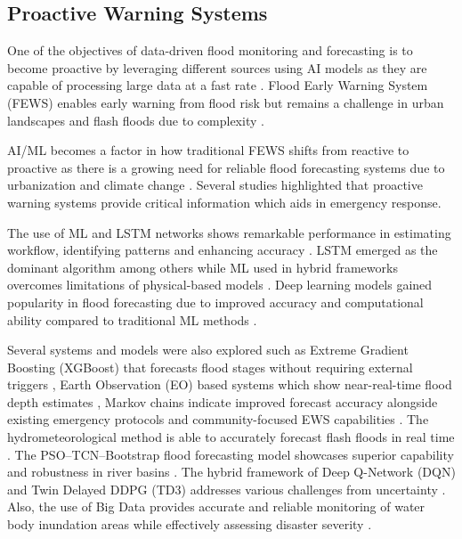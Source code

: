 \documentclass{research}
\begin{document}
\subsection*{Proactive Warning Systems}

One of the objectives of data-driven flood monitoring and forecasting is to become proactive by leveraging different sources using AI models as they are capable of processing large data at a fast rate \cite{demelo2024early,zlopasa2024leveraging}. Flood Early Warning System (FEWS) enables early warning from flood risk but remains a challenge in urban landscapes \cite{hofmann2020risk,lee2020integrated,palash2024datadriven} and flash floods due to complexity \cite{soares2025ml4ff}.

AI/ML becomes a factor in how traditional FEWS shifts from reactive to proactive \cite{alrawas2024critical,piadeh2022critical} as there is a growing need for reliable flood forecasting systems due to urbanization and climate change \cite{fernandeznovoa2024enhancing,hossoda2025datadriven,oddo2024deep}. Several studies \cite{lee2023maxfloodcast,alasali2021sustainable,najafi2024high} highlighted that proactive warning systems provide critical information which aids in emergency response.

The use of ML and LSTM networks shows remarkable performance in estimating workflow, identifying patterns and enhancing accuracy \cite{nevo2022flood,khan2025development,aravamudan2025superresolution}. LSTM emerged as the dominant algorithm \cite{kuhaneswaran2025evolution} among others while ML used in hybrid frameworks overcomes limitations of physical-based models \cite{li2024optimizing,refadah2025development}. Deep learning models gained popularity in flood forecasting due to improved accuracy and computational ability compared to traditional ML methods \cite{situ2024improving,yi2024reservoir}.

Several systems and models were also explored such as Extreme Gradient Boosting (XGBoost) that forecasts flood stages without requiring external triggers \cite{sanders2022datadriven}, Earth Observation (EO) based systems which show near-real-time flood depth estimates \cite{destefanis2025advancing}, Markov chains indicate improved forecast accuracy alongside existing emergency protocols \cite{bibbo2025flood} and community-focused EWS capabilities \cite{cheong2024development}. The hydrometeorological method is able to accurately forecast flash floods in real time \cite{troselj2023realtime}. The PSO--TCN--Bootstrap flood forecasting model showcases superior capability and robustness in river basins \cite{yu2025research}. The hybrid framework of Deep Q-Network (DQN) and Twin Delayed DDPG (TD3) addresses various challenges from uncertainty \cite{rashid2024realtime}. Also, the use of Big Data provides accurate and reliable monitoring of water body inundation areas while effectively assessing disaster severity \cite{hou2025development}.
\end{document}
